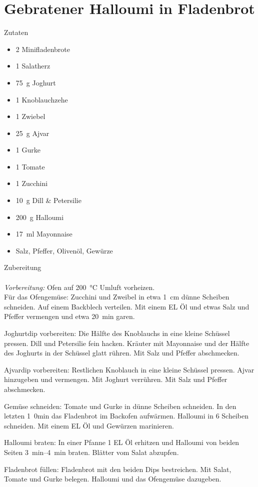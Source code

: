 \section*{Gebratener Halloumi in Fladenbrot}
\ihead{}\ohead{}
\cfoot{}
{\Large Zutaten}
\begin{multicols}{2}
\begin{itemize}
    \item \num{2} Minifladenbrote
    \item \num{1} Salatherz
    \item \SI{75}{g} Joghurt
    \item \num{1} Knoblauchzehe
    \item \num{1} Zwiebel
    \item \SI{25}{g} Ajvar
    \item \num{1} Gurke
    \item \num{1} Tomate
    \item \num{1} Zucchini
    \item \SI{10}{g} Dill \& Petersilie
    \item \SI{200}{g} Halloumi
    \item \SI{17}{ml} Mayonnaise
    \item Salz, Pfeffer, Olivenöl, Gewürze
\end{itemize}
\end{multicols}
\noindent
{\Large Zubereitung}\\
\\
\textit{Vorbereitung:} Ofen auf \SI{200}{\celsius} Umluft vorheizen.\\
Für das Ofengemüse: Zucchini und Zweibel in etwa \SI{1}{cm} dünne Scheiben schneiden.
Auf einem Backblech verteilen.
Mit einem EL Öl und etwas Salz und Pfeffer vermengen und etwa \SI{20}{min} garen.

Joghurtdip vorbereiten: Die Hälfte des Knoblauchs in eine kleine Schüssel pressen.
Dill und Petersilie fein hacken. 
Kräuter mit Mayonnaise und der Hälfte des Joghurts in der Schüssel glatt rühren.
Mit Salz und Pfeffer abschmecken.

Ajvardip vorbereiten: Restlichen Knoblauch in eine kleine Schüssel pressen. 
Ajvar hinzugeben und vermengen. 
Mit Joghurt verrühren.
Mit Salz und Pfeffer abschmecken.

Gemüse schneiden: Tomate und Gurke in dünne Scheiben schneiden. 
In den letzten \SI{1}{0min} das Fladenbrot im Backofen aufwärmen.
Halloumi in \num{6} Scheiben schneiden. 
Mit einem EL Öl und Gewürzen marinieren. 

Halloumi braten: 
In einer Pfanne \num{1} EL Öl erhitzen und Halloumi von beiden Seiten \SIrange{3}{4}{min} braten. 
Blätter vom Salat abzupfen. 

Fladenbrot füllen: 
Fladenbrot mit den beiden Dips bestreichen. 
Mit Salat, Tomate und Gurke belegen. 
Halloumi und das Ofengemüse dazugeben. 